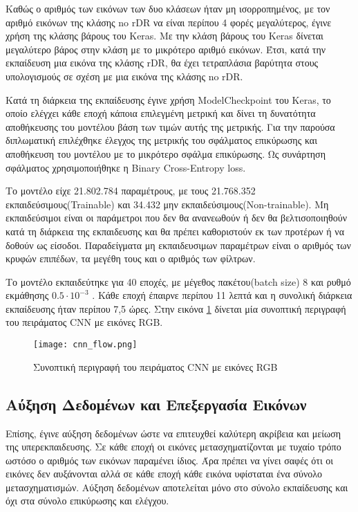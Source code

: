 Καθώς ο αριθμός των εικόνων των δυο κλάσεων ήταν μη ισορροπημένος, με τον αριθμό εικόνων της κλάσης no rDR να είναι περίπου 4  φορές μεγαλύτερος, έγινε χρήση της κλάσης βάρους του Keras. Με την κλάση βάρους του Keras δίνεται μεγαλύτερο βάρος στην κλάση με το μικρότερο αριθμό εικόνων. 
Έτσι, κατά την εκπαίδευση μια εικόνα της κλάσης rDR, θα έχει τετραπλάσια βαρύτητα στους υπολογισμούς σε σχέση με μια εικόνα της κλάσης no rDR.


Κατά τη διάρκεια της εκπαίδευσης έγινε χρήση ModelCheckpoint του Keras, το οποίο ελέγχει κάθε εποχή κάποια  επιλεγμένη μετρική και δίνει τη δυνατότητα αποθήκευσης του μοντέλου βάση των τιμών αυτής της μετρικής. Για την παρούσα διπλωματική επιλέχθηκε έλεγχος της μετρικής του σφάλματος επικύρωσης και αποθήκευση του μοντέλου με το μικρότερο σφάλμα επικύρωσης. Ως συνάρτηση σφάλματος χρησιμοποιήθηκε η Binary Cross-Entropy loss.

Το μοντέλο είχε 21.802.784 παραμέτρους, με τους 21.768.352 εκπαιδεύσιμους(Trainable) και 34.432 μην εκπαιδεύσιμους(Non-trainable). Μη εκπαιδεύσιμοι είναι οι παράμετροι που δεν θα ανανεωθούν ή δεν θα βελτισοποιηθούν κατά τη διάρκεια της εκπαιδευσης και θα πρέπει  καθοριστούν εκ των προτέρων ή να δοθούν ως είσοδοι. Παραδείγματα μη εκπαιδευσιμων παραμέτρων είναι ο αριθμός των κρυφών επιπέδων, τα μεγέθη τους και ο αριθμός των φίλτρων. 

Το μοντέλο εκπαιδεύτηκε για 40 εποχές, με μέγεθος πακέτου(batch size) 8 και ρυθμό εκμάθησης $0.5 \cdot 10^{-3}$ . Κάθε εποχή έπαιρνε περίπου 11 λεπτά και η συνολική διάρκεια εκπαίδευσης ήταν περίπου 7,5 ώρες. Στην εικόνα \ref{figure:cnnflow} δίνεται μία συνοπτική περιγραφή του πειράματος CNN με εικόνες RGB.



\begin{figure}[!h]
    \centering
      \texttt{[image: cnn\_flow.png]} \caption{Συνοπτική περιγραφή του πειράματος CNN με εικόνες RGB}
\label{figure:cnnflow}  
\end{figure}



\subsection{Αύξηση Δεδομένων και Επεξεργασία Εικόνων}
\label{subsec:5.1.2}

Επίσης, έγινε αύξηση δεδομένων ώστε να επιτευχθεί καλύτερη ακρίβεια και μείωση της υπερεκπαιδευσης. Σε κάθε εποχή οι εικόνες μετασχηματίζονται με τυχαίο τρόπο ωστόσο ο  αριθμός των εικόνων παραμένει ίδιος. Άρα πρέπει να γίνει σαφές ότι οι εικόνες δεν αυξάνονται αλλά σε κάθε εποχή κάθε εικόνα υφίσταται ένα σύνολο μετασχηματισμών. Αύξηση δεδομένων αποτελείται μόνο στο σύνολο εκπαίδευσης και όχι στα σύνολο επικύρωσης και ελέγχου.

